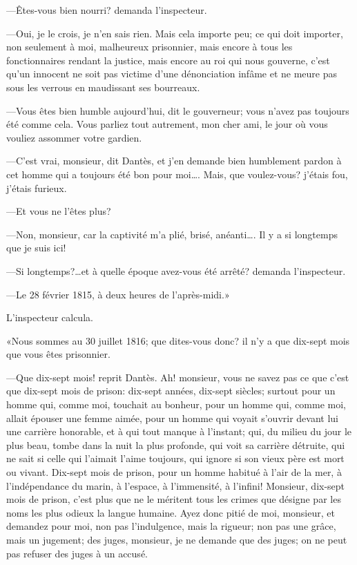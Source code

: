 —Êtes-vous bien nourri? demanda l'inspecteur.

—Oui, je le crois, je n'en sais rien. Mais cela importe peu; ce qui doit importer, non seulement à moi, malheureux prisonnier, mais encore à tous les fonctionnaires rendant la justice, mais encore au roi qui nous gouverne, c'est qu'un innocent ne soit pas victime d'une dénonciation infâme et ne meure pas sous les verrous en maudissant ses bourreaux.

—Vous êtes bien humble aujourd'hui, dit le gouverneur; vous n'avez pas toujours été comme cela. Vous parliez tout autrement, mon cher ami, le jour où vous vouliez assommer votre gardien.

—C'est vrai, monsieur, dit Dantès, et j'en demande bien humblement pardon à cet homme qui a toujours été bon pour moi\dots. Mais, que voulez-vous? j'étais fou, j'étais furieux.

—Et vous ne l'êtes plus?

—Non, monsieur, car la captivité m'a plié, brisé, anéanti\dots. Il y a si longtemps que je suis ici!

—Si longtemps?\dots et à quelle époque avez-vous été arrêté? demanda l'inspecteur.

—Le 28 février 1815, à deux heures de l'après-midi.»

L'inspecteur calcula.

«Nous sommes au 30 juillet 1816; que dites-vous donc? il n'y a que dix-sept mois que vous êtes prisonnier.

—Que dix-sept mois! reprit Dantès. Ah! monsieur, vous ne savez pas ce que c'est que dix-sept mois de prison: dix-sept années, dix-sept siècles; surtout pour un homme qui, comme moi, touchait au bonheur, pour un homme qui, comme moi, allait épouser une femme aimée, pour un homme qui voyait s'ouvrir devant lui une carrière honorable, et à qui tout manque à l'instant; qui, du milieu du jour le plus beau, tombe dans la nuit la plus profonde, qui voit sa carrière détruite, qui ne sait si celle qui l'aimait l'aime toujours, qui ignore si son vieux père est mort ou vivant. Dix-sept mois de prison, pour un homme habitué à l'air de la mer, à l'indépendance du marin, à l'espace, à l'immensité, à l'infini! Monsieur, dix-sept mois de prison, c'est plus que ne le méritent tous les crimes que désigne par les noms les plus odieux la langue humaine. Ayez donc pitié de moi, monsieur, et demandez pour moi, non pas l'indulgence, mais la rigueur; non pas une grâce, mais un jugement; des juges, monsieur, je ne demande que des juges; on ne peut pas refuser des juges à un accusé.

